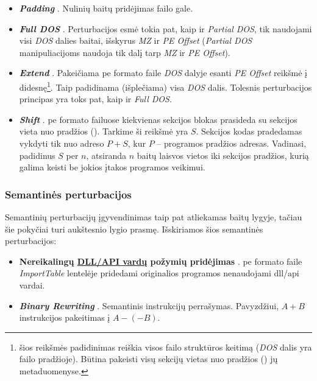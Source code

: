 \begin{itemize}
    \item \textbf{\textit{Padding}} \cite{demetrioAdversarialEXEmplesSurvey2021}. Nulinių baitų pridėjimas failo gale.
    \item \textbf{\textit{Full DOS}} \cite{demetrioAdversarialEXEmplesSurvey2021}. Perturbacijos esmė tokia pat, kaip ir \textit{Partial DOS}, tik naudojami visi \textit{DOS} dalies baitai, išskyrus \textit{MZ} ir \textit{PE Offset} (\textit{Partial DOS} manipuliacijoms naudoja tik dalį tarp \textit{MZ} ir \textit{PE Offset}).
    \item \textbf{\textit{Extend}} \cite{demetrioAdversarialEXEmplesSurvey2021}. Pakeičiama \acs{pe} formato faile \textit{DOS} dalyje esanti \textit{PE Offset} reikšmė į didesnę\footnote{\label{footnote:structure}šios reikšmės padidinimas reiškia visos failo struktūros keitimą (\textit{DOS} dalis yra failo pradžioje). Būtina pakeisti visų sekcijų vietas nuo pradžios () jų metaduomenyse.}. Taip padidinama (išplečiama) visa \textit{DOS} dalis. Tolesnis perturbacijos principas yra toks pat, kaip ir \textit{Full DOS}.
    \item \textbf{\textit{Shift}} \cite{demetrioAdversarialEXEmplesSurvey2021}. \acs{pe} formato failuose kiekvienas sekcijos blokas prasideda su sekcijos vieta nuo pradžios (). Tarkime ši reikšmė yra $S$. Sekcijos kodas pradedamas vykdyti tik nuo adreso $P+S$, kur $P$ -- programos pradžios adresas. Vadinasi, padidinus $S$ per $n$, atsiranda $n$ baitų laisvos vietos iki sekcijos pradžios, kurią galima keisti be jokios įtakos programos veikimui.
\end{itemize}
\subsubsection{Semantinės perturbacijos}\label{sec:literature:perturbations:semantic}
Semantinių perturbacijų įgyvendinimas taip pat atliekamas baitų lygyje, tačiau šie pokyčiai turi aukštesnio lygio prasmę. Išskiriamos šios semantinės perturbacijos:
\begin{itemize}
    \item \textbf{Nereikalingų \hyperref[feature:dll]{DLL/API vardų} požymių pridėjimas} \cite{huGeneratingAdversarialMalware2017}. \acs{pe} formato faile \textit{ImportTable} lentelėje pridedami originalios programos nenaudojami \acs{dll}/\acs{api} vardai.
    \item \textbf{\textit{Binary Rewriting}} \cite{demetrioAdversarialEXEmplesSurvey2021}. Semantinis instrukcijų perrašymas. Pavyzdžiui, $A+B$ instrukcijos pakeitimas į $A-(-B)$.
\end{itemize}

